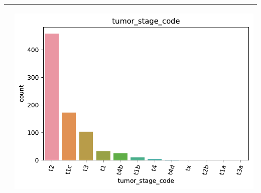\begin{table}[!htb]
\begin{threeparttable}
\begin{tabular}{p{8cm} p{7cm}}
			& \begin{center}\includegraphics[width=1\linewidth]{NOTEBOOK/IMAGENES_DESCRIPTIVAS/5_tumor_stage_code}\end{center}
			\\ \hline
		\end{tabular}
	\end{threeparttable}
\end{table}


